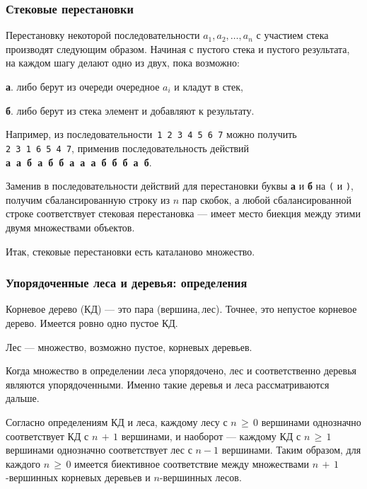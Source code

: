 \documentclass[mathserif]{beamer}
\newenvironment{items}[1][\labelitemi]{\begin{list}{#1}{\setlength{\topsep}{0pt}\setlength{\partopsep}{0pt}\setlength{\parsep}{0pt}\setlength{\itemsep}{\parskip}}}{\end{list}}
\begin{document}
\begin{frame}[fragile]%
\frametitle{Стековые перестановки}
Перестановку некоторой последовательности $a_1,a_2,\dots,a_n$ с участием стека производят следующим образом.
Начиная с пустого стека и пустого результата, на каждом шагу делают одно из двух, пока возможно:
\begin{items}[]
\item[{\bf{}а}.] либо берут из очереди очередное $a_i$ и кладут в стек,
\item[{\bf{}б}.] либо берут из стека элемент и добавляют к результату.
\end{items}

\medskip

Например, из последовательности \,\texttt{1~2~3~4~5~6~7} можно получить \texttt{2~3~1~6~5~4~7}, применив последовательность действий {\bf{}а~а~б~а~б~б~а~а~а~б~б~б~а~б}.

\medskip

Заменив в последовательности действий для перестановки буквы {\bf{}а} и {\bf{}б} на \verb.(. и \verb.)., получим сбалансированную строку из $n$ пар скобок, а любой сбалансированной строке соответствует стековая перестановка — имеет место биекция между этими двумя множествами объектов.

\medskip

Итак, стековые перестановки есть каталаново множество.
\end{frame}

\begin{frame}[fragile]%
\frametitle{Упорядоченные леса и деревья: определения}
Корневое дерево (КД) — это пара (вершина,\,лес).
Точнее, это непустое корневое дерево.
Имеется ровно одно пустое КД.

\medskip

Лес — множество, возможно пустое, корневых деревьев.

\medskip

Когда множество в определении леса упорядочено, лес и соответственно деревья являются упорядоченными.
Именно такие деревья и леса рассматриваются дальше.

\medskip

Согласно определениям КД и леса, каждому лесу с $n\,{\ge}\,0$ вершинами однозначно соответствует КД с $n\,{+}\,1$ вершинами, и наоборот — каждому КД с $n\,{\ge}\,1$ вершинами однозначно соответствует лес с $n{-}1$ вершинами.
Таким образом, для каждого $n\,{\ge}\,0$ имеется биективное соответствие между множествами $n\,{+}\,1$-вершинных корневых деревьев и $n$-вершинных лесов.
\end{frame}
\end{document}
